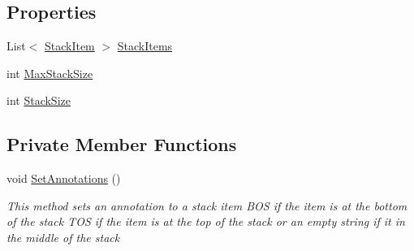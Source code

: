 \subsection*{Properties}
\begin{DoxyCompactItemize}
\item 
List$<$ \hyperlink{class_c_p_u___o_s___simulator_1_1_c_p_u_1_1_stack_item}{Stack\+Item} $>$ \hyperlink{class_c_p_u___o_s___simulator_1_1_c_p_u_1_1_program_stack_a13eb0a485bbcdba8a38bbf80e78692c7}{Stack\+Items}
\item 
int \hyperlink{class_c_p_u___o_s___simulator_1_1_c_p_u_1_1_program_stack_a5ed770e83658cfcde6e451c27342dca3}{Max\+Stack\+Size}
\item 
int \hyperlink{class_c_p_u___o_s___simulator_1_1_c_p_u_1_1_program_stack_ac9cedcbfdf26ffa757042280f21da367}{Stack\+Size}
\end{DoxyCompactItemize}
\subsection*{Private Member Functions}
\begin{DoxyCompactItemize}
\item 
void \hyperlink{class_c_p_u___o_s___simulator_1_1_c_p_u_1_1_program_stack_a64ba20aa2a49863d1197a9aeb31b4a13}{Set\+Annotations} ()
\begin{DoxyCompactList}\small\item\em This method sets an annotation to a stack item B\+O\+S if the item is at the bottom of the stack T\+O\+S if the item is at the top of the stack or an empty string if it in the middle of the stack \end{DoxyCompactList}\end{DoxyCompactItemize}
